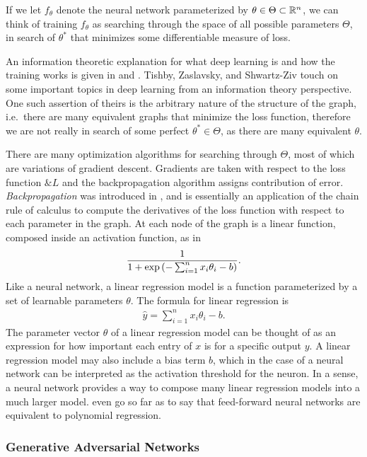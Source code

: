 If we let $f_\theta$ denote the neural network parameterized by
$\theta \in \Theta \subset \mathbb{R}^n$, we can think of training $f_\theta$
as searching through the space of all possible parameters $\Theta$, in
search of $\theta^*$ that minimizes some differentiable measure of
loss.

An information theoretic explanation for what deep learning is and how
the training works is given in \cite{ref:tishby-2015} and
\cite{ref:tishby-2017}. Tishby, Zaslavsky, and Shwartz-Ziv touch on
some important topics in deep learning from an information theory
perspective.  One such assertion of theirs is the arbitrary nature of
the structure of the graph, i.e.\ there are many equivalent graphs
that minimize the loss function, therefore we are not really in search
of some perfect $\theta^* \in \Theta$, as there are many equivalent
$\theta$.

There are many optimization algorithms for searching through $\Theta$,
most of which are variations of gradient descent. Gradients are taken
with respect to the loss function $\&L$ and the backpropagation
algorithm assigns contribution of error. \textit{Backpropagation} was
introduced in \cite{ref:rumelhart-1986}, and is essentially an
application of the chain rule of calculus to compute the derivatives
of the loss function with respect to each parameter in the graph.  At
each node of the graph is a linear function, composed inside an
activation function, as in
\begin{align}
{1 \over 1 + \exp{\left(- \sum_{i = 1}^n x_i\theta_i - b \right)}}.
\end{align}
Like a neural network, a linear regression model is a function
parameterized by a set of learnable parameters $\theta$. The formula
for linear regression is
\begin{align}
  \label{eq:lin-reg} \hat{y} = \sum_{i=1}^n x_i\theta_i - b.
\end{align} The parameter vector $\theta$ of a linear regression model
can be thought of as an expression for how important each entry of
$x$ is for a specific output $y$. A linear regression model
may also include a bias term $b$, which in the case of a neural
network can be interpreted as the activation threshold for the
neuron. In a sense, a neural network provides a way to compose many
linear regression models into a much larger
model. \cite{ref:cheng-2018} even go so far as to say that
feed-forward neural networks are equivalent to polynomial regression.

\subsubsection*{Generative Adversarial Networks}

